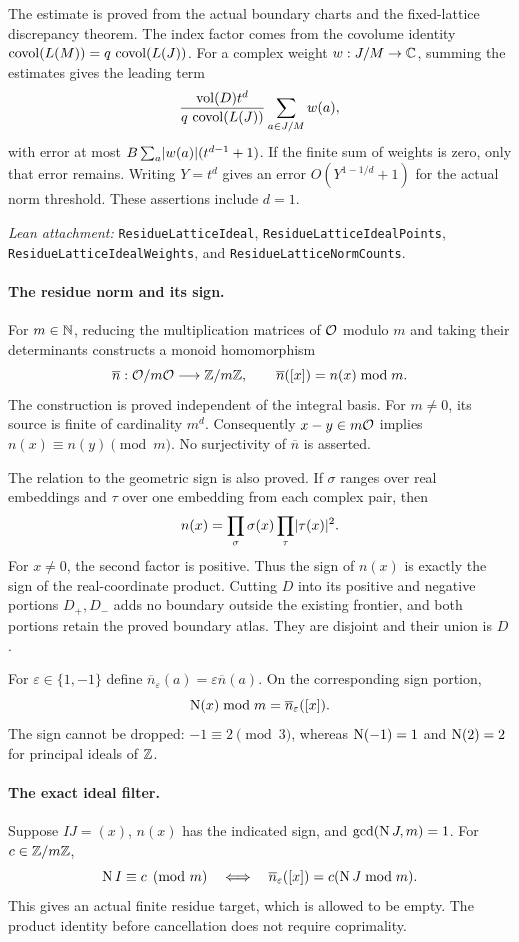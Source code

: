 The estimate is proved from the actual boundary charts and the fixed-lattice
discrepancy theorem. The index factor comes from the covolume identity
$\operatorname{covol}(L(M))=q\,\operatorname{covol}(L(J))$.
For a complex weight $w:J/M\to\mathbb C$, summing the estimates gives the leading
term
\[
 \frac{\operatorname{vol}(D)t^d}{q\,\operatorname{covol}(L(J))}\sum_{a\in J/M}w(a),
\]
with error at most $B\sum_a\lvert w(a)\rvert(t^{d-1}+1)$.
If the finite sum of weights is zero, only that error remains.
Writing $Y=t^d$ gives an error $O(Y^{1-1/d}+1)$ for the actual norm threshold.
These assertions include $d=1$.

\smallskip
\noindent\emph{Lean attachment:}
\texttt{ResidueLatticeIdeal}, \texttt{ResidueLatticeIdealPoints},
\texttt{ResidueLatticeIdealWeights}, and \texttt{ResidueLatticeNormCounts}.

\newpage
\paragraph{The residue norm and its sign.}
For $m\in\mathbb N$, reducing the multiplication matrices of $\mathcal O$ modulo $m$
and taking their determinants constructs a monoid homomorphism
\[
 \overline n:\mathcal O/m\mathcal O\longrightarrow\mathbb Z/m\mathbb Z,
 \qquad \overline n([x])=n(x)\bmod m.
\]
The construction is proved independent of the integral basis.
For $m\ne0$, its source is finite of cardinality $m^d$.
Consequently $x-y\in m\mathcal O$ implies $n(x)\equiv n(y)\pmod m$.
No surjectivity of $\overline n$ is asserted.

The relation to the geometric sign is also proved. If $\sigma$ ranges over
real embeddings and $\tau$ over one embedding from each complex pair, then
\[
 n(x)=\prod_{\sigma}\sigma(x)\prod_{\tau}\lvert \tau(x)\rvert^2.
\]
For $x\ne0$, the second factor is positive. Thus the sign of $n(x)$ is
exactly the sign of the real-coordinate product. Cutting $D$ into its
positive and negative portions $D_+,D_-$ adds no boundary outside the
existing frontier, and both portions retain the proved boundary atlas.
They are disjoint and their union is $D$.

For $\varepsilon\in\{1,-1\}$ define
$\overline n_{\varepsilon}(a)=\varepsilon\overline n(a)$.
On the corresponding sign portion,
\[
 \operatorname N(x)\bmod m=\overline n_{\varepsilon}([x]).
\]
The sign cannot be dropped: $-1\equiv2\pmod3$, whereas
$\operatorname N(-1)=1$ and $\operatorname N(2)=2$ for principal ideals of $\mathbb Z$.

\paragraph{The exact ideal filter.}
Suppose $IJ=(x)$, $n(x)$ has the indicated sign, and
$\gcd(\operatorname N J,m)=1$. For $c\in\mathbb Z/m\mathbb Z$,
\[
 \operatorname N I\equiv c\pmod m
 \quad\Longleftrightarrow\quad
 \overline n_{\varepsilon}([x])=c(\operatorname N J\bmod m).
\]
This gives an actual finite residue target, which is allowed to be empty.
The product identity before cancellation does not require coprimality.

